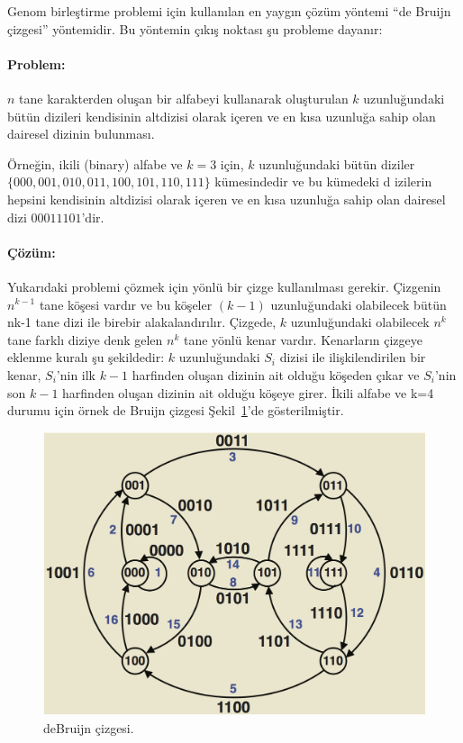 
Genom birleştirme problemi için kullanılan en yaygın çözüm yöntemi ``de Bruijn çizgesi'' yöntemidir. Bu yöntemin çıkış noktası şu probleme dayanır:

\paragraph{Problem:} $n$ tane karakterden oluşan bir alfabeyi kullanarak oluşturulan $k$ uzunluğundaki bütün dizileri kendisinin altdizisi olarak içeren ve en kısa uzunluğa sahip olan dairesel dizinin bulunması. 

Örneğin, ikili (binary) alfabe ve $k=3$ için, $k$ uzunluğundaki bütün diziler $\{000, 001, 010, 011, 100, 101, 110, 111\}$ kümesindedir ve bu kümedeki d
izilerin hepsini kendisinin altdizisi olarak içeren ve en kısa uzunluğa sahip olan dairesel dizi $00011101$'dir.

\paragraph{Çözüm:}
Yukarıdaki problemi çözmek için yönlü bir çizge kullanılması gerekir. Çizgenin $n^{k-1}$ tane köşesi vardır ve bu köşeler $(k-1)$ uzunluğundaki olabilecek bütün nk-1 tane dizi ile birebir alakalandırılır. Çizgede, $k$ uzunluğundaki olabilecek $n^k$ tane farklı diziye denk gelen $n^k$ tane yönlü kenar vardır. Kenarların çizgeye eklenme kuralı şu şekildedir: $k$ uzunluğundaki $S_i$ dizisi ile ilişkilendirilen bir kenar, $S_i$'nin ilk $k-1$ harfinden oluşan dizinin ait olduğu köşeden çıkar ve $S_i$'nin son $k-1$ harfinden oluşan dizinin ait olduğu köşeye girer. İkili alfabe ve k=4 durumu için örnek de Bruijn çizgesi Şekil~\ref{fig:debruijn}'de gösterilmiştir.

\begin{figure}[htb]
  \begin{center}
    \includegraphics[scale=0.4]{debruijn.png}
  \end{center}
  \caption{deBruijn çizgesi.}
  \label{fig:debruijn}
\end{figure}

